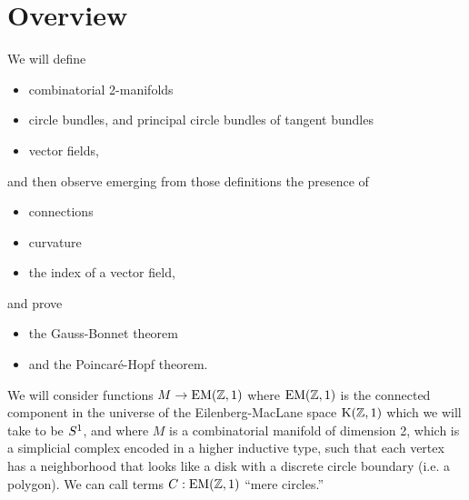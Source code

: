 \section{Overview}
We will define 
\begin{itemize}
\item combinatorial 2-manifolds
\item circle bundles, and principal circle bundles of tangent bundles
\item vector fields,
\end{itemize}
and then observe emerging from those definitions the presence of
\begin{itemize}
\item connections
\item curvature
\item the index of a vector field,
\end{itemize}
and prove
\begin{itemize}
\item the Gauss-Bonnet theorem
\item and the Poincaré-Hopf theorem.
\end{itemize}

We will consider functions \( M\to \mathrm{EM}(\mathbb{Z},1) \) where \( \mathrm{EM}(\mathbb{Z},1) \) is the connected component in the universe of the Eilenberg-MacLane space \( \mathrm{K}(\mathbb{Z},1) \) which we will take to be \( S^1 \), and where \( M \) is a combinatorial manifold of dimension 2, which is a simplicial complex encoded in a higher inductive type, such that each vertex has a neighborhood that looks like a disk with a discrete circle boundary (i.e. a polygon). We can call terms \( C:\mathrm{EM}(\mathbb{Z},1) \) ``mere circles.''

